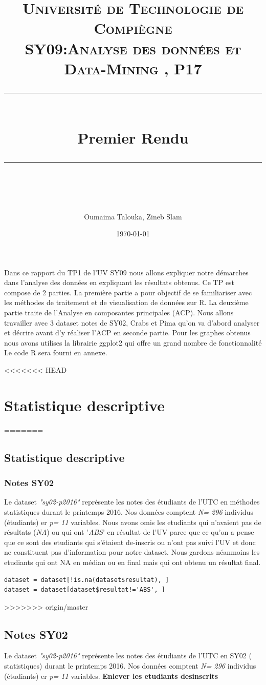 \documentclass[]{report}
\title{
	\normalfont \normalsize 
	\textsc{Université de Technologie de Compiègne\\ 
		SY09:Analyse des données et Data-Mining , P17} \\
	[10pt] 
	\rule{\linewidth}{0.5pt} \\[6pt] 
	\huge Premier Rendu \\
	\rule{\linewidth}{2pt}  \\[10pt]
}
\author{Oumaima Talouka, Zineb Slam}
\date{\normalsize \today}
\begin{document}
	
{\let\newpage\relax\maketitle}

Dans ce rapport du TP1 de l'UV SY09 nous allons expliquer notre démarches dans l'analyse des données en expliquant les résultats obtenus. Ce TP est compose de 2 parties. La première partie a pour objectif de se familiariser avec les méthodes de traitement et de visualisation de données sur R. La deuxième partie traite de l'Analyse en composantes principales (ACP). Nous allons travailler avec 3 dataset notes de SY02, Crabs et Pima qu'on va d'abord analyser et décrire avant d'y réaliser l'ACP en seconde partie. Pour les graphes obtenus nous avons utilises la librairie ggplot2 qui offre un grand nombre de fonctionnalité Le code R sera fourni en annexe.



\tableofcontents

<<<<<<< HEAD
\chapter{ Statistique descriptive}
=======
\section{ Statistique descriptive}

\subsection{Notes SY02}
Le dataset \textit{"sy02-p2016"} représente les notes des étudiants de l'UTC en méthodes statistiques durant le printemps 2016. Nos données comptent \textit{N= 296} individus (étudiants) er \textit{p= 11} variables. Nous avons omis  les etudiants qui n'avaient pas de résultats (\textit{NA}) ou qui ont '\textit{ABS}' en résultat de l'UV parce que ce qu'on a pense que ce sont des etudiants qui s'étaient de-inscris ou n'ont pas suivi l'UV et donc ne constituent pas d'information pour notre dataset. Nous gardons néanmoins les etudiants qui ont NA en médian ou en final mais qui ont obtenu un résultat final. 

\begin{lstlisting}
dataset = dataset[!is.na(dataset$resultat), ]
dataset = dataset[dataset$resultat!='ABS', ]
\end{lstlisting}
>>>>>>> origin/master

\section{Notes SY02}
Le dataset \textit{"sy02-p2016"} représente les notes des étudiants de l'UTC en SY02 ( statistiques) durant le printemps 2016. Nos données comptent \textit{N= 296} individus (étudiants) er \textit{p= 11} variables.  \textbf{Enlever les etudiants desinscrits}
\end{document}

